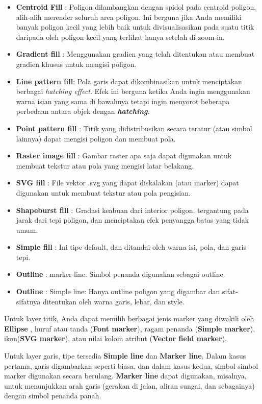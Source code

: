 \documentclass[]{book}
\begin{document}
\begin{itemize}
\item
  \textbf{Centroid Fill} : Poligon dilambangkan dengan spidol pada centroid poligon, alih-alih merender seluruh area poligon. Ini berguna jika Anda memiliki banyak poligon kecil yang lebih baik untuk divisualisasikan pada suatu titik daripada oleh poligon kecil yang terlihat hanya setelah di-zoom-in.
\item
  \textbf{Gradient fill} : Menggunakan gradien yang telah ditentukan atau membuat gradien khusus untuk mengisi poligon.
\item
  \textbf{Line pattern fill}: Pola garis dapat dikombinasikan untuk menciptakan berbagai \emph{hatching effect}. Efek ini berguna ketika Anda ingin menggunakan warna isian yang sama di bawahnya tetapi ingin menyorot beberapa perbedaan antara objek dengan \textbf{\emph{hatching}}.
\item
  \textbf{Point pattern fill} : Titik yang didistribusikan secara teratur (atau simbol lainnya) dapat mengisi poligon dan membuat pola.
\item
  \textbf{Raster image fill} : Gambar raster apa saja dapat digunakan untuk membuat tekstur atau pola yang mengisi latar belakang.
\item
  \textbf{SVG fill} : File vektor .svg yang dapat diskalakan (atau marker) dapat digunakan untuk membuat tekstur atau pola pengisian.
\item
  \textbf{Shapeburst fill} : Gradasi keabuan dari interior poligon, tergantung pada jarak dari tepi poligon, dan menciptakan efek penyangga batas yang tidak umum.
\item
  \textbf{Simple fill} : Ini tipe default, dan ditandai oleh warna isi, pola, dan garis tepi.
\item
  \textbf{Outline} : marker line: Simbol penanda digunakan sebagai outline.
\item
  \textbf{Outline} : Simple line: Hanya outline poligon yang digambar dan sifat-sifatnya ditentukan oleh warna garis, lebar, dan style.
\end{itemize}

Untuk layer titik, Anda dapat memilih berbagai jenis marker yang diwakili oleh \textbf{Ellipse} , huruf atau tanda (\textbf{Font marker}), ragam penanda (\textbf{Simple marker}), ikon(\textbf{SVG marker}), atau nilai kolom atribut (\textbf{Vector field marker}).

Untuk layer garis, tipe tersedia \textbf{Simple line} dan \textbf{Marker line}. Dalam kasus pertama, garis digambarkan seperti biasa, dan dalam kasus kedua, simbol simbol marker digunakan secara berulang. \textbf{Marker line} dapat digunakan, misalnya, untuk menunjukkan arah garis (gerakan di jalan, aliran sungai, dan sebagainya) dengan simbol penanda panah.
\end{document}
